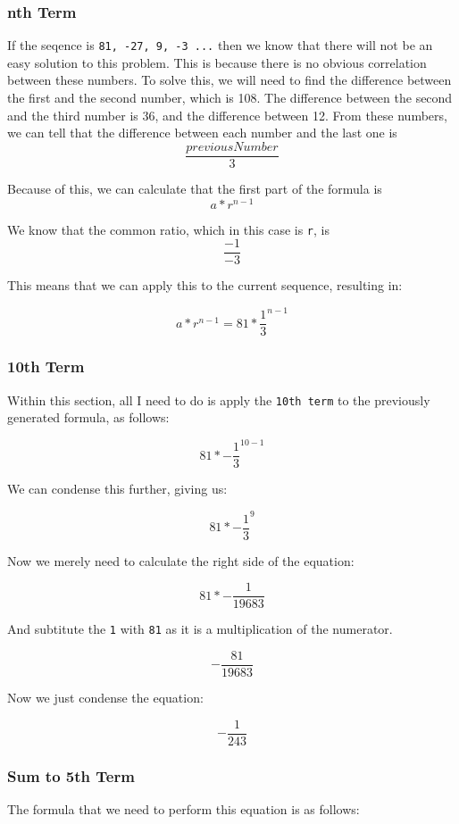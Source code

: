 \documentclass[a4paper,12pt]{article}
\begin{document}
\subsubsection{nth Term}
If the seqence is \texttt{81, -27, 9, -3 ...} then we know that there will not be an easy solution to this problem. This is because there is no obvious correlation between these numbers. To solve this, we will need to find the difference between the first and the second number, which is \textsc{108}. The difference between the second and the third number is \textsc{36}, and the difference between \textsc{12}. From these numbers, we can tell that the difference between each number and the last one is $$\frac{previousNumber}{3}$$

Because of this, we can calculate that the first part of the formula is $$a * r^{n-1}$$

We know that the common ratio, which in this case is \texttt{r}, is $$\frac{-1}{-3}$$

This means that we can apply this to the current sequence, resulting in:

$$a * r^{n-1} = 81 * \frac{1}{3}^{n-1}$$

\newpage

\subsubsection{10th Term}
Within this section, all I need to do is apply the \texttt{10th term} to the previously generated formula, as follows:

$$81 * -\frac{1}{3}^{10-1}$$

We can condense this further, giving us:

$$81 * -\frac{1}{3}^{9}$$

Now we merely need to calculate the right side of the equation:

$$81 * -\frac{1}{19683}$$

And subtitute the \texttt{1} with \texttt{81} as it is a multiplication of the numerator.

$$-\frac{81}{19683}$$

Now we just condense the equation:

$$-\frac{1}{243}$$

\subsubsection{Sum to 5th Term}
The formula that we need to perform this equation is as follows:
\end{document}
